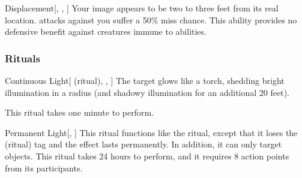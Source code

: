 \lowercase{\hypertarget{spell:Displacement}{}}\label{spell:Displacement}
\begin{freeability}[Rank 8]{\hypertarget{spell:Displacement}{Displacement}}[, , ]
Your image appears to be two to three feet from its real location.
  attacks against you suffer a 50\% miss chance.
This ability provides no defensive benefit against creatures immune to  abilities.
\end{freeability}
\vspace{0.25em}



\subsubsection{Rituals}


\lowercase{\hypertarget{spell:Continuous Light}{}}\label{spell:Continuous Light}
\begin{attuneability}[Rank 1]{\hypertarget{spell:Continuous Light}{Continuous Light}}[ (ritual), , ]
The target glows like a torch, shedding bright illumination in a \areamed radius (and shadowy illumination for an additional 20 feet).

This ritual takes one minute to perform.
\end{attuneability}
\vspace{0.25em}



\lowercase{\hypertarget{spell:Permanent Light}{}}\label{spell:Permanent Light}
\begin{apability}[Rank 3]{\hypertarget{spell:Permanent Light}{Permanent Light}}[, ]
This ritual functions like the  ritual, except that it loses the  (ritual) tag and the effect lasts permanently.
In addition, it can only target objects.
This ritual takes 24 hours to perform, and it requires 8 action points from its participants.
\end{apability}
\vspace{0.25em}


